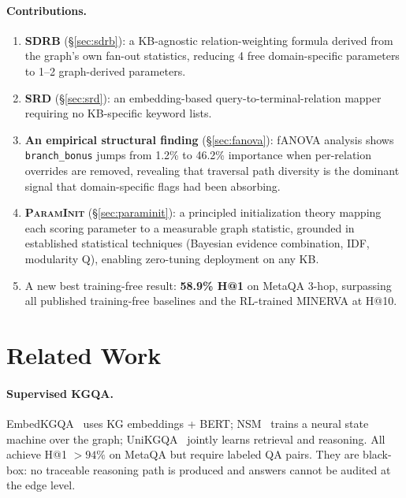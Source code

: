 \documentclass[10pt,twocolumn]{article}
\newcommand{\SDRB}{\textsc{SDRB}}
\newcommand{\SRD}{\textsc{SRD}}
\newcommand{\PI}{\textsc{ParamInit}}
\newcommand{\fanova}{f\textsc{ANOVA}}
\begin{document}
\paragraph{Contributions.}
\begin{enumerate}
  \item \textbf{\SDRB{}} (\S\ref{sec:sdrb}): a KB-agnostic relation-weighting
        formula derived from the graph's own fan-out statistics, reducing 4 free
        domain-specific parameters to 1--2 graph-derived parameters.
  \item \textbf{\SRD{}} (\S\ref{sec:srd}): an embedding-based
        query-to-terminal-relation mapper requiring no KB-specific keyword lists.
  \item \textbf{An empirical structural finding} (\S\ref{sec:fanova}):
        \fanova{} analysis shows \texttt{branch\_bonus} jumps from 1.2\%
        to 46.2\% importance when per-relation overrides are removed, revealing
        that traversal path diversity is the dominant signal that domain-specific
        flags had been absorbing.
  \item \textbf{\PI{}} (\S\ref{sec:paraminit}): a principled initialization
        theory mapping each scoring parameter to a measurable graph statistic,
        grounded in established statistical techniques (Bayesian evidence
        combination, IDF, modularity Q), enabling zero-tuning deployment on
        any KB.
  \item A new best training-free result: \textbf{58.9\% H@1} on MetaQA 3-hop,
        surpassing all published training-free baselines and the RL-trained
        MINERVA at H@10.
\end{enumerate}

\section{Related Work}
\label{sec:related}

\paragraph{Supervised KGQA.}
EmbedKGQA~\cite{saxena2020improve} uses KG embeddings + BERT; NSM~\cite{he2021}
trains a neural state machine over the graph; UniKGQA~\cite{jiang2023} jointly
learns retrieval and reasoning. All achieve H@1 $>94\%$ on MetaQA but require
labeled QA pairs. They are black-box: no traceable reasoning path is produced
and answers cannot be audited at the edge level.
\end{document}
